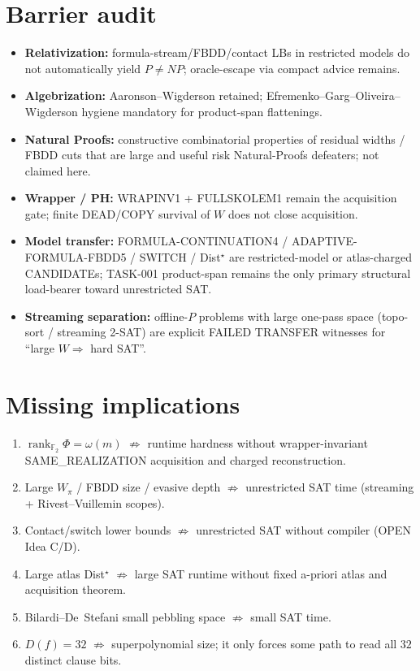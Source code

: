 \documentclass[11pt]{article}
\begin{document}
\section*{Barrier audit}
\begin{itemize}
\item \textbf{Relativization:} formula-stream/FBDD/contact LBs in restricted models do not
  automatically yield $P\neq NP$; oracle-escape via compact advice remains.
\item \textbf{Algebrization:} Aaronson--Wigderson retained; Efremenko--Garg--Oliveira--Wigderson
  hygiene mandatory for product-span flattenings.
\item \textbf{Natural Proofs:} constructive combinatorial properties of residual widths / FBDD
  cuts that are large and useful risk Natural-Proofs defeaters; not claimed here.
\item \textbf{Wrapper / PH:} WRAPINV1 + FULLSKOLEM1 remain the acquisition gate;
  finite DEAD/COPY survival of $W$ does not close acquisition.
\item \textbf{Model transfer:} FORMULA-CONTINUATION4 / ADAPTIVE-FORMULA-FBDD5 / SWITCH /
  Dist$^\star$ are restricted-model or atlas-charged CANDIDATEs;
  TASK-001 product-span remains the only primary structural load-bearer toward unrestricted SAT.
\item \textbf{Streaming separation:} offline-$P$ problems with large one-pass space
  (topo-sort / streaming 2-SAT) are explicit FAILED TRANSFER witnesses for
  ``large $W\Rightarrow$ hard SAT''.
\end{itemize}

\section*{Missing implications}
\begin{enumerate}
\item $\operatorname{rank}_{\mathbb F_2}\Phi=\omega(m)$ $\not\Rightarrow$ runtime hardness without
  wrapper-invariant SAME\_REALIZATION acquisition and charged reconstruction.
\item Large $W_\pi$ / FBDD size / evasive depth $\not\Rightarrow$ unrestricted SAT time
  (streaming + Rivest--Vuillemin scopes).
\item Contact/switch lower bounds $\not\Rightarrow$ unrestricted SAT without compiler (OPEN Idea C/D).
\item Large atlas Dist$^\star$ $\not\Rightarrow$ large SAT runtime without fixed a-priori atlas
  and acquisition theorem.
\item Bilardi--De~Stefani small pebbling space $\not\Rightarrow$ small SAT time.
\item $D(f)=32$ $\not\Rightarrow$ superpolynomial size; it only forces some path to read all
  $32$ distinct clause bits.
\end{enumerate}
\end{document}
